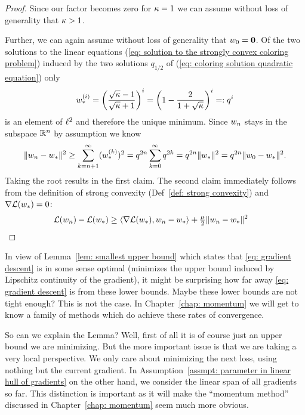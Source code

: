 \begin{proof}
	Since our factor becomes zero for \(\kappa=1\) we can assume without loss
	of generality that \(\kappa>1\).
	
	Further, we can again assume without loss of generality that
	\(w_0=\mathbf{0}\).  Of the two solutions to the linear equations
	(\ref{eq: solution to the strongly convex coloring problem}) induced by the
	two solutions \(q_{1/2}\) of (\ref{eq: coloring solution quadratic equation})
	only
	\begin{align*}
		w_*^{(i)} = \left(\frac{\sqrt{\kappa}-1}{\sqrt{\kappa}+1}\right)^i
		= \left(1 - \frac{2}{1+\sqrt{\kappa}}\right)^i =: q^i
	\end{align*}
	is an element of \(\ell^{2}\) and therefore the unique minimum. Since 
	\(w_n\) stays in the subspace \(\mathbb{R}^n\) by assumption we know
	\begin{align*}
		\|w_n -w_*\|^2
		\ge \sum_{k=n+1}^\infty (w_*^{(k)})^2
		= q^{2n} \sum_{k=0}^\infty q^{2k}
		= q^{2n} \| w_*\|^2
		= q^{2n} \|w_0 - w_*\|^2.
	\end{align*}
	Taking the root results in the first claim. The second claim immediately
	follows from the definition of strong convexity (Def~\ref{def: strong convexity})
	and \(\nabla\mathcal{L}(w_*) = 0\):
	\begin{align*}
		\mathcal{L}(w_n) - \mathcal{L}(w_*)
		&\ge \langle \nabla\mathcal{L}(w_*), w_n -w_*\rangle
		+\tfrac{\mu}{2} \|w_n -w_*\|^2
		\qedhere
	\end{align*}
\end{proof}

In view of Lemma~\ref{lem: smallest upper bound} which states that \ref{eq:
gradient descent} is in some sense optimal (minimizes the upper bound induced by
Lipschitz continuity of the gradient), it might be surprising how far away
\ref{eq: gradient descent} is from these lower bounds. Maybe these lower bounds are not
tight enough? This is not the case. In Chapter~\ref{chap: momentum} we will get
to know a family of methods which do achieve these rates of convergence.

So can we
explain the Lemma? Well, first of all it is of course just an upper bound we
are minimizing. But the more important issue is that we are taking a very
local perspective. We only care about minimizing the next loss, using 
nothing but the current gradient. In Assumption~\ref{assmpt: parameter in
linear hull of gradients} on the other hand, we consider the linear span of all
gradients so far. This distinction is important as it will make the
``momentum method'' discussed in Chapter~\ref{chap: momentum} seem much more obvious.

